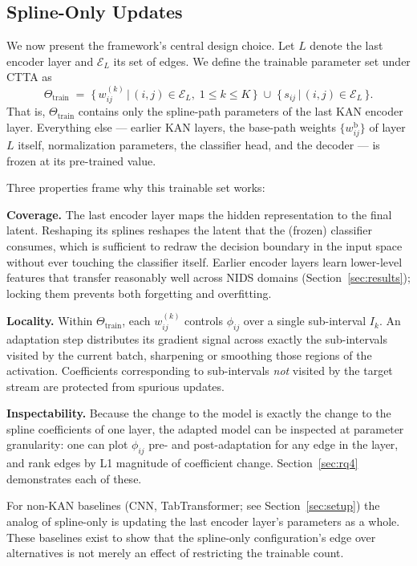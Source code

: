 \documentclass[10pt, conference, letterpaper]{IEEEtran}
\begin{document}
\subsection{Spline-Only Updates}
\label{sec:spline-only}

We now present the framework's central design choice. Let $L$ denote the last encoder layer and $\mathcal{E}_L$ its set of edges. We define the trainable parameter set under CTTA as
\begin{equation}
\label{eq:theta-train}
\Theta_{\text{train}} \;=\; \Big\{\, w_{ij}^{(k)} \,\Big|\, (i,j) \in \mathcal{E}_L,\; 1 \leq k \leq K \,\Big\} \;\cup\; \Big\{\, s_{ij} \,\Big|\, (i,j) \in \mathcal{E}_L \,\Big\}.
\end{equation}
That is, $\Theta_{\text{train}}$ contains only the spline-path parameters of the last KAN encoder layer. Everything else --- earlier KAN layers, the base-path weights $\{w^{\text{b}}_{ij}\}$ of layer $L$ itself, normalization parameters, the classifier head, and the decoder --- is frozen at its pre-trained value.

Three properties frame why this trainable set works:

\textbf{Coverage.} The last encoder layer maps the hidden representation to the final latent. Reshaping its splines reshapes the latent that the (frozen) classifier consumes, which is sufficient to redraw the decision boundary in the input space without ever touching the classifier itself. Earlier encoder layers learn lower-level features that transfer reasonably well across NIDS domains (Section~\ref{sec:results}); locking them prevents both forgetting and overfitting.

\textbf{Locality.} Within $\Theta_{\text{train}}$, each $w_{ij}^{(k)}$ controls $\phi_{ij}$ over a single sub-interval $I_k$. An adaptation step distributes its gradient signal across exactly the sub-intervals visited by the current batch, sharpening or smoothing those regions of the activation. Coefficients corresponding to sub-intervals \emph{not} visited by the target stream are protected from spurious updates.

\textbf{Inspectability.} Because the change to the model is exactly the change to the spline coefficients of one layer, the adapted model can be inspected at parameter granularity: one can plot $\phi_{ij}$ pre- and post-adaptation for any edge in the layer, and rank edges by L1 magnitude of coefficient change. Section~\ref{sec:rq4} demonstrates each of these.

For non-KAN baselines (CNN, TabTransformer; see Section~\ref{sec:setup}) the analog of spline-only is updating the last encoder layer's parameters as a whole. These baselines exist to show that the spline-only configuration's edge over alternatives is not merely an effect of restricting the trainable count.
\end{document}
